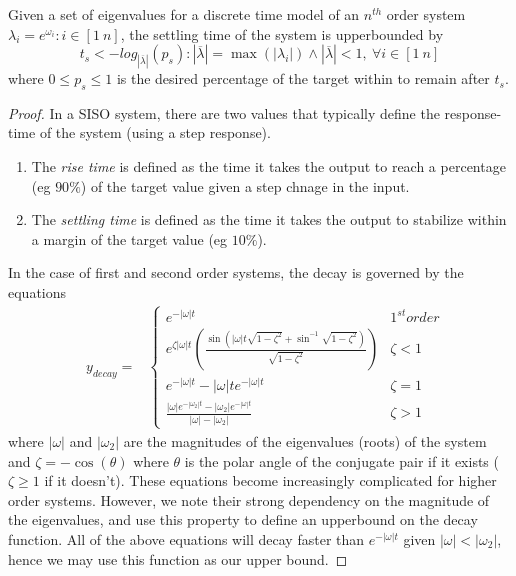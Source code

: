 \documentclass[sigconf]{llncs}
\begin{document}
\begin{theorem}
Given a set of eigenvalues for a discrete time model of an $n^{th}$ order system $\lambda_i =e^{\omega_i}: i \in [1\ n]$, the settling time of the system is upperbounded by
\begin{equation}
t_s<-log_{|\overline{\lambda}|}({p_s}) : |\overline{\lambda}| =\max(|\lambda_i|) \wedge |\overline{\lambda}|<1,\ \forall i \in [1\ n]
\label{eq:set_time}
\end{equation}
where $0\leq p_s \leq 1$ is the desired percentage of the target within to remain after $t_s$.
\end{theorem} 
\begin{proof}
In a SISO system, there are two values that typically define the
response-time of the system (using a step response).
%
\begin{enumerate}
\item The \emph{rise time} is defined as the time it takes the output to reach a percentage (eg $90\%$) of the target value given a step chnage in the input.
\item The \emph{settling time} is defined as the time it takes the output to stabilize within a margin of the target value (eg $10\%$).
\end{enumerate} 
%
In the case of first and second order systems, the decay is governed by the equations 
%
\begin{align*}
&y_{decay}=
&\left\{
\begin{array}{cc}
e^{-|\omega| t}& 1^{st} order\\
e^{\zeta |\omega| t}\left(\frac{\sin\left(|\omega| t\sqrt{1-\zeta^2}+\sin^{-1}\sqrt{1-\zeta^2}\right)}{\sqrt{1-\zeta^2}} \right)&\zeta<1\\
e^{-|\omega| t}-|\omega| t e^{-|\omega| t}&\zeta=1\\
\frac{|\omega| e^{-|\omega_2| t}-|\omega_2| e^{-|\omega| t}}{|\omega|-|\omega_2|}&\zeta>1\end{array}\right.
\end{align*}
where $|\omega|$ and $|\omega_2|$ are the magnitudes of the eigenvalues (roots) of the system and  $\zeta=-\cos(\theta)$ where $\theta$ is the polar angle of the conjugate pair if it exists ($\zeta \geq 1$ if it doesn't).
These equations become increasingly complicated for higher order systems. However, we note their strong dependency on the magnitude of the eigenvalues, and use this property to define an upperbound on the decay function.
All of the above equations will decay faster than $e^{-|\omega| t}$ given $|\omega| < |\omega_2|$, hence we may use this function as our upper bound.


\end{proof}
\end{document}
